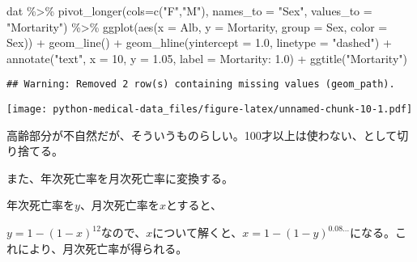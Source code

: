 \documentclass[
]{book}
\newenvironment{Shaded}{\begin{snugshade}}{\end{snugshade}}
\newcommand{\AttributeTok}[1]{\textcolor[rgb]{0.77,0.63,0.00}{#1}}
\newcommand{\DecValTok}[1]{\textcolor[rgb]{0.00,0.00,0.81}{#1}}
\newcommand{\FloatTok}[1]{\textcolor[rgb]{0.00,0.00,0.81}{#1}}
\newcommand{\FunctionTok}[1]{\textcolor[rgb]{0.00,0.00,0.00}{#1}}
\newcommand{\NormalTok}[1]{#1}
\newcommand{\SpecialCharTok}[1]{\textcolor[rgb]{0.00,0.00,0.00}{#1}}
\newcommand{\StringTok}[1]{\textcolor[rgb]{0.31,0.60,0.02}{#1}}
\begin{document}
\begin{Shaded}
\begin{Highlighting}[]
\NormalTok{dat }\SpecialCharTok{\%\textgreater{}\%} 
        \FunctionTok{pivot\_longer}\NormalTok{(}\AttributeTok{cols=}\FunctionTok{c}\NormalTok{(}\StringTok{"F"}\NormalTok{,}\StringTok{"M"}\NormalTok{), }\AttributeTok{names\_to =} \StringTok{"Sex"}\NormalTok{, }\AttributeTok{values\_to =} \StringTok{"Mortarity"}\NormalTok{) }\SpecialCharTok{\%\textgreater{}\%} 
        \FunctionTok{ggplot}\NormalTok{(}\FunctionTok{aes}\NormalTok{(}\AttributeTok{x =}\NormalTok{ Alb, }\AttributeTok{y =}\NormalTok{ Mortarity, }\AttributeTok{group =}\NormalTok{ Sex, }\AttributeTok{color =}\NormalTok{ Sex)) }\SpecialCharTok{+} 
        \FunctionTok{geom\_line}\NormalTok{() }\SpecialCharTok{+} 
        \FunctionTok{geom\_hline}\NormalTok{(}\AttributeTok{yintercept =} \FloatTok{1.0}\NormalTok{, }\AttributeTok{linetype =} \StringTok{"dashed"}\NormalTok{) }\SpecialCharTok{+} 
        \FunctionTok{annotate}\NormalTok{(}\StringTok{"text"}\NormalTok{, }\AttributeTok{x =} \DecValTok{10}\NormalTok{, }\AttributeTok{y =} \FloatTok{1.05}\NormalTok{, }\AttributeTok{label =} \StringTok{\textquotesingle{}Mortarity: 1.0\textquotesingle{}}\NormalTok{) }\SpecialCharTok{+} 
        \FunctionTok{ggtitle}\NormalTok{(}\StringTok{"Mortarity"}\NormalTok{)}
\end{Highlighting}
\end{Shaded}

\begin{verbatim}
## Warning: Removed 2 row(s) containing missing values (geom_path).
\end{verbatim}

\texttt{[image: python-medical-data\_files/figure-latex/unnamed-chunk-10-1.pdf]}

高齢部分が不自然だが、そういうものらしい。100才以上は使わない、として切り捨てる。

また、年次死亡率を月次死亡率に変換する。

年次死亡率を\(y\)、月次死亡率を\(x\)とすると、

\(y = 1 - (1-x)^{12}\)なので、\(x\)について解くと、\(x = 1 - (1-y)^{0.08...}\)になる。これにより、月次死亡率が得られる。
\end{document}
